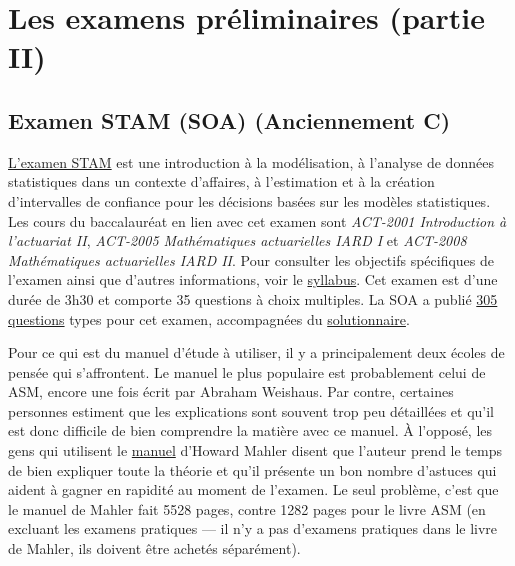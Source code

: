 \section*{Les examens préliminaires (partie II)}
\label{sec:prelimssuite}
\subsection*{Examen STAM (SOA) (Anciennement C)}
\label{subsec:examSTAM}
\href{https://www.soa.org/education/exam-req/edu-exam-c-detail.aspx}{L'examen STAM} est une introduction à la modélisation, à l'analyse de données statistiques dans un contexte d'affaires, à l'estimation et à la création d'intervalles de confiance pour les décisions basées sur les modèles statistiques. Les cours du baccalauréat en lien avec cet examen sont \textit{ACT-2001 Introduction à l'actuariat II}, \textit{ACT-2005 Mathématiques actuarielles IARD I} et \textit{ACT-2008 Mathématiques actuarielles IARD II}. Pour consulter les objectifs spécifiques de l'examen ainsi que d'autres informations, voir le \href{https://www.soa.org/Files/Edu/2017/edu-2017-02-exam-c-syllabus.pdf}{syllabus}. Cet examen est d'une durée de 3h30 et comporte 35 questions à choix multiples. La SOA a publié \href{http://www.soa.org/files/edu/edu-exam-c-sample-quest.pdf}{305 questions} types pour cet examen, accompagnées du \href{http://www.soa.org/files/edu/edu-exam-c-sample-sol.pdf}{solutionnaire}.\vspace{\baselineskip}

Pour ce qui est du manuel d'étude à utiliser, il y a principalement deux écoles de pensée qui s'affrontent. Le manuel le plus populaire est probablement celui de ASM, encore une fois écrit par Abraham Weishaus. Par contre, certaines personnes estiment que les explications sont souvent trop peu détaillées et qu'il est donc difficile de bien comprendre la matière avec ce manuel. À l'opposé, les gens qui utilisent le \href{http://howardmahler.com/Teaching/C.html}{manuel} d'Howard Mahler disent que l'auteur prend le temps de bien expliquer toute la théorie et qu'il présente un bon nombre d'astuces qui aident à gagner en rapidité au moment de l'examen. Le seul problème, c'est que le manuel de Mahler fait 5528 pages, contre 1282 pages pour le livre ASM (en excluant les examens pratiques --- il n'y a pas d'examens pratiques dans le livre de Mahler, ils doivent être achetés séparément). \vspace{\baselineskip}

